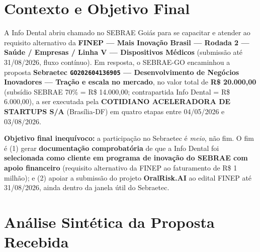\documentclass[11pt, a4paper]{article}
\newcommand{\destaque}[2]{%
    \vspace{2pt}
    \colorbox{#1!10}{%
        \parbox{\dimexpr\textwidth-2\fboxsep}{%
            \small #2%
        }%
    }
    \vspace{4pt}
}
\begin{document}
\section{Contexto e Objetivo Final}

A Info Dental abriu chamado no SEBRAE Goiás para se capacitar e atender ao requisito alternativo da \textbf{FINEP --- Mais Inovação Brasil --- Rodada 2 --- Saúde / Empresas / Linha V --- Dispositivos Médicos} (submissão até 31/08/2026, fluxo contínuo). Em resposta, o SEBRAE-GO encaminhou a proposta \textbf{Sebraetec \texttt{GO202604136905} --- Desenvolvimento de Negócios Inovadores --- Tração e escala no mercado}, no valor total de \textbf{R\$ 20.000,00} (subsídio SEBRAE 70\% = R\$ 14.000,00; contrapartida Info Dental = R\$ 6.000,00), a ser executada pela \textbf{COTIDIANO ACELERADORA DE STARTUPS S/A} (Brasília-DF) em quatro etapas entre 04/05/2026 e 03/08/2026.

\destaque{accentColor}{%
    \textcolor{accentColor}{\textbf{Objetivo final inequívoco:}} a participação no Sebraetec é \emph{meio}, não fim. O fim é (1) gerar \textbf{documentação comprobatória} de que a Info Dental foi \textbf{selecionada como cliente em programa de inovação do SEBRAE com apoio financeiro} (requisito alternativo da FINEP ao faturamento de R\$ 1 milhão); e (2) apoiar a submissão do projeto \textbf{OralRisk.AI} ao edital FINEP até 31/08/2026, ainda dentro da janela útil do Sebraetec.%
}

\section{Análise Sintética da Proposta Recebida}
\end{document}
